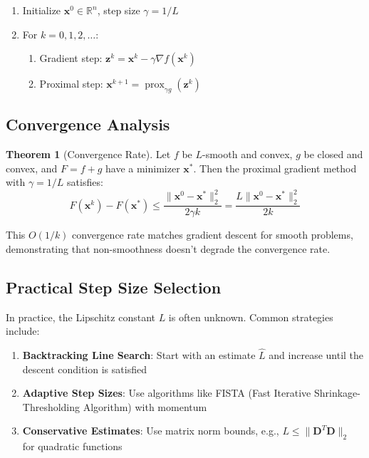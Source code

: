 \documentclass[12pt]{article}
\renewcommand{\vec}[1]{\mathbf{#1}}
\DeclareMathOperator{\prox}{prox}
\newcommand{\norm}[1]{\lVert #1 \rVert}
\newcommand{\R}{\mathbb{R}}
\theoremstyle{definition}
\newtheorem{theorem}{Theorem}[section]
\begin{document}
\begin{algorithm}
    \begin{enumerate}
        \item Initialize $\vec{x}^0 \in \R^n$, step size $\gamma = 1/L$
        \item For $k = 0, 1, 2, \ldots$:
              \begin{enumerate}[label=(\alph*)]
                  \item Gradient step: $\vec{z}^k = \vec{x}^k - \gamma \nabla f(\vec{x}^k)$
                  \item Proximal step: $\vec{x}^{k+1} = \prox_{\gamma g}(\vec{z}^k)$
              \end{enumerate}
    \end{enumerate}
\end{algorithm}

\subsection{Convergence Analysis}

\begin{theorem}[Convergence Rate]\label{thm:convergence}
    Let $f$ be $L$-smooth and convex, $g$ be closed and convex, and $F = f + g$ have a minimizer $\vec{x}^*$. Then the proximal gradient method with $\gamma = 1/L$ satisfies:
    \begin{equation}
        F(\vec{x}^k) - F(\vec{x}^*) \leq \frac{\norm{\vec{x}^0 - \vec{x}^*}_2^2}{2\gamma k} = \frac{L\norm{\vec{x}^0 - \vec{x}^*}_2^2}{2k}
    \end{equation}
\end{theorem}

This $O(1/k)$ convergence rate matches gradient descent for smooth problems, demonstrating that non-smoothness doesn't degrade the convergence rate.

\subsection{Practical Step Size Selection}

In practice, the Lipschitz constant $L$ is often unknown. Common strategies include:

\begin{enumerate}
    \item \textbf{Backtracking Line Search}: Start with an estimate $\hat{L}$ and increase until the descent condition is satisfied
    \item \textbf{Adaptive Step Sizes}: Use algorithms like FISTA (Fast Iterative Shrinkage-Thresholding Algorithm) with momentum
    \item \textbf{Conservative Estimates}: Use matrix norm bounds, e.g., $L \leq \norm{\vec{D}^T\vec{D}}_2$ for quadratic functions
\end{enumerate}
\end{document}

